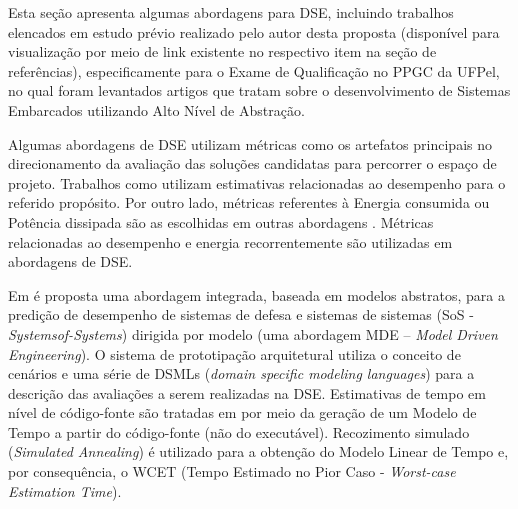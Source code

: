 \documentclass[tese-proposta,nocipinfo]{texufpel}
\begin{document}
Esta seção apresenta algumas abordagens para DSE, incluindo trabalhos elencados em estudo prévio realizado pelo autor desta proposta \cite{Betemps_2017_EQ} (disponível para visualização por meio de link existente no respectivo item na seção de referências), especificamente para o Exame de Qualificação no PPGC da UFPel, no qual foram levantados artigos que tratam sobre o desenvolvimento de Sistemas Embarcados utilizando Alto Nível de Abstração.

Algumas abordagens de DSE utilizam métricas como os artefatos principais no direcionamento da avaliação das soluções candidatas para percorrer o espaço de projeto. Trabalhos como \cite{Gheorghita:2009:SDD:1455229.1455232,Raymond2015,Rodriguez2017,Falkner2016,Altenbernd2016,Hendriks2016,Huang2015} utilizam estimativas relacionadas ao desempenho para o referido propósito. Por outro lado, métricas referentes à Energia consumida ou Potência dissipada são as escolhidas em outras abordagens \cite{Ouni2017203,Jiang:2016:PDT:2872313.2801152,Sorber:2007:ELR:1322263.1322279,Kim_Hong2015}. Métricas relacionadas ao desempenho e energia recorrentemente são utilizadas em abordagens de DSE.


Em \cite{Falkner2016} é proposta uma abordagem integrada, baseada em modelos abstratos, para a predição de desempenho de sistemas de defesa e sistemas de sistemas (SoS - \textit{Systemsof-Systems}) dirigida por modelo (uma abordagem MDE -- \textit{Model Driven Engineering}). O sistema de prototipação arquitetural utiliza o conceito de cenários e uma série de DSMLs (\textit{domain specific modeling languages}) para a descrição das avaliações a serem realizadas na DSE. Estimativas de tempo em nível de código-fonte são tratadas em \cite{Altenbernd2016} por meio da geração de um Modelo de Tempo a partir do código-fonte (não do executável). Recozimento simulado (\textit{Simulated Annealing}) é utilizado para a obtenção do Modelo Linear de Tempo e, por consequência, o WCET (Tempo Estimado no Pior Caso - \textit{Worst-case Estimation Time}). 
\end{document}
